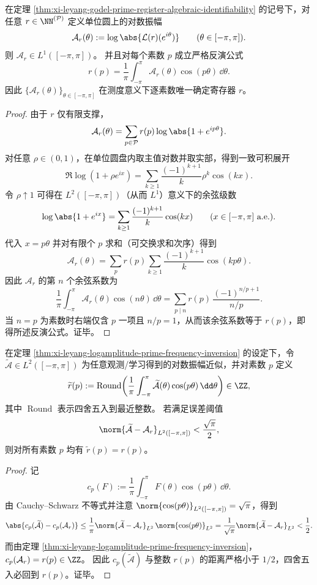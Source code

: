 \begin{theorem}\label{thm:xi-leyang-logamplitude-prime-frequency-inversion}
在定理 \ref{thm:xi-leyang-godel-prime-register-algebraic-identifiability} 的记号下，对任意 \(r\in\NN^{(\mathcal P)}\) 定义单位圆上的对数振幅
\[
\mathcal A_r(\theta):=\log\abs{\mathcal L(r)(e^{i\theta})}\qquad(\theta\in[-\pi,\pi]).
\]
则 \(\mathcal A_r\in L^1([-\pi,\pi])\)。
并且对每个素数 \(p\) 成立严格反演公式
\[
\boxed{\quad
r(p)=\frac1\pi\int_{-\pi}^{\pi}\mathcal A_r(\theta)\cos(p\theta)\,\dd\theta.\quad}
\]
因此 \(\{\mathcal A_r(\theta)\}_{\theta\in[-\pi,\pi]}\) 在测度意义下逐素数唯一确定寄存器 \(r\)。
\end{theorem}
\begin{proof}
由于 \(r\) 仅有限支撑，
\[
\mathcal A_r(\theta)=\sum_{p\in\mathcal P}r(p)\log\abs{1+e^{ip\theta}}.
\]
对任意 \(\rho\in(0,1)\)，在单位圆盘内取主值对数并取实部，得到一致可积展开
\[
\Re\log(1+\rho e^{ix})
=\sum_{k\ge 1}\frac{(-1)^{k+1}}{k}\rho^k\cos(kx).
\]
令 \(\rho\uparrow 1\) 可得在 \(L^2([-\pi,\pi])\)（从而 \(L^1\)）意义下的余弦级数
\[
\log\abs{1+e^{ix}}
=\sum_{k\ge 1}\frac{(-1)^{k+1}}{k}\cos(kx)
\qquad(x\in[-\pi,\pi]\text{ a.e.}).
\]
代入 \(x=p\theta\) 并对有限个 \(p\) 求和（可交换求和次序）得到
\[
\mathcal A_r(\theta)
=\sum_{p}r(p)\sum_{k\ge 1}\frac{(-1)^{k+1}}{k}\cos(kp\theta).
\]
因此 \(\mathcal A_r\) 的第 \(n\) 个余弦系数为
\[
\frac1\pi\int_{-\pi}^{\pi}\mathcal A_r(\theta)\cos(n\theta)\,\dd\theta
=\sum_{p\mid n} r(p)\,\frac{(-1)^{n/p+1}}{n/p}.
\]
当 \(n=p\) 为素数时右端仅含 \(p\) 一项且 \(n/p=1\)，从而该余弦系数等于 \(r(p)\)，即得所述反演公式。证毕。
\end{proof}

\begin{corollary}\label{cor:xi-leyang-logamplitude-rounding-threshold}
在定理 \ref{thm:xi-leyang-logamplitude-prime-frequency-inversion} 的设定下，令 \(\widetilde{\mathcal A}\in L^2([-\pi,\pi])\) 为任意观测/学习得到的对数振幅近似，并对素数 \(p\) 定义
\[
\widetilde r(p):=\operatorname{Round}\!\left(\frac1\pi\int_{-\pi}^{\pi}\widetilde{\mathcal A}(\theta)\cos(p\theta)\,\dd\theta\right)\in\ZZ,
\]
其中 \(\operatorname{Round}\) 表示四舍五入到最近整数。
若满足误差阈值
\[
\norm{\widetilde{\mathcal A}-\mathcal A_r}_{L^2([-\pi,\pi])}<\frac{\sqrt\pi}{2},
\]
则对所有素数 \(p\) 均有 \(\widetilde r(p)=r(p)\)。
\end{corollary}
\begin{proof}
记
\[
c_p(F):=\frac1\pi\int_{-\pi}^{\pi}F(\theta)\cos(p\theta)\,\dd\theta.
\]
由 Cauchy--Schwarz 不等式并注意 \(\norm{\cos(p\theta)}_{L^2([-\pi,\pi])}=\sqrt\pi\)，得到
\[
\abs{c_p(\widetilde{\mathcal A})-c_p(\mathcal A_r)}
\le \frac1\pi\norm{\widetilde{\mathcal A}-\mathcal A_r}_{L^2}\,\norm{\cos(p\theta)}_{L^2}
=\frac1{\sqrt\pi}\norm{\widetilde{\mathcal A}-\mathcal A_r}_{L^2}
<\frac12.
\]
而由定理 \ref{thm:xi-leyang-logamplitude-prime-frequency-inversion}，\(c_p(\mathcal A_r)=r(p)\in\ZZ\)。
因此 \(c_p(\widetilde{\mathcal A})\) 与整数 \(r(p)\) 的距离严格小于 \(1/2\)，四舍五入必回到 \(r(p)\)。证毕。
\end{proof}

